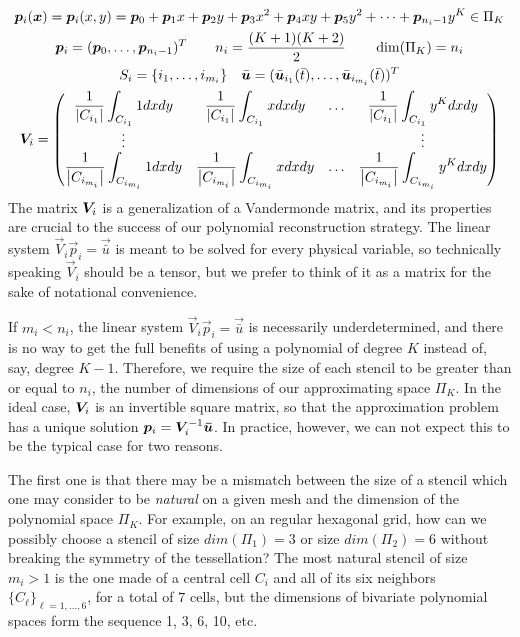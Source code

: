 \begin{gather*}
\bm{p}_i(\bm{x})
=\bm{p}_i(x,y)
=\bm{p}_{0}+\bm{p}_{1}x+\bm{p}_{2}y+\bm{p}_{3}x^{2}+\bm{p}_{4}xy+\bm{p}_{5}y^{2}+
\dots+\bm{p}_{n_{i}-1}y^{K} \in \Pi_K \\
\bm{p}_i = (\bm{p}_0, \dots, \bm{p}_{n_i-1})^T \qquad
n_{i}=\frac{(K+1)(K+2)}{2} \qquad \dim(\Pi_K) = n_i \\
S_{i}=\{i_{1},\dots,i_{m_{i}}\} \quad
\bar{\bm{u}} = (\bar{\bm{u}}_{i_1}(\bar{t}),
	\dots, \bar{\bm{u}}_{i_{m_i}}(\bar{t}))^T \\
\bm{V}_{i}=\begin{pmatrix}
\dfrac{1}{\left| C_{i_{1}} \right|}\displaystyle\int_{C_{i_{1}}} 1 dxdy &\dfrac{1}{\left| C_{i_{1}} \right|} \displaystyle\int_{C_{i_{1}}} x dxdy &\dots&\dfrac{1}{\left| C_{i_{1}} \right|}\displaystyle\int_{C_{i_{1}}} y^{K} dxdy\\
\vdots&&&\vdots\\
\dfrac{1}{\left| C_{i_{m_{i}}} \right|}\displaystyle\int_{C_{i_{m_{i}}}} 1 dxdy &\dfrac{1}{\left| C_{i_{m_{i}}} \right|} \displaystyle\int_{C_{i_{m_{i}}}} x dxdy &\dots&\dfrac{1}{\left| C_{i_{m_{i}}} \right|}\displaystyle\int_{C_{i_{m_{i}}}} y^{K} dxdy\\
\end{pmatrix}
\end{gather*}
The matrix $\bm{V}_{i}$ is a generalization of a Vandermonde matrix, and its
properties are crucial to the success of our polynomial reconstruction strategy.
The linear system $\vec{V}_{i}\vec{p}_{i}=\vec{\bar{u}}$ is meant to be solved
for every physical variable, so technically speaking $\vec{V}_{i}$ should
be a tensor, but we prefer to think of it as a matrix for the sake of
notational convenience.

If $m_{i}<n_{i}$, the linear system $\vec{V}_{i}\vec{p}_{i}=\vec{\bar{u}}$
is necessarily underdetermined, and there is no way to get the full benefits
of using a polynomial of degree $K$ instead of, say, degree $K-1$. Therefore,
we require the size of each stencil to be greater than or equal to $n_{i}$,
the number of dimensions of our approximating space $\Pi_K$. In the ideal
case, $\bm{V}_{i}$ is an invertible square matrix, so that the approximation
problem has a unique solution $\bm{p}_{i}=\bm{V}^{-1}_{i}\bm{\bar{u}}$.
In practice, however, we can not expect this to be the typical case for two reasons.

The first one is that there may be a mismatch between the size of a stencil
which one may consider to be \emph{natural} on a given mesh and the dimension of
the polynomial space $\Pi_{K}$. For example, on an regular hexagonal grid,
how can we possibly choose a stencil of size $dim(\Pi_{1})=3$ or size
$dim(\Pi_{2})=6$ without breaking the symmetry of the tessellation?
The most natural stencil of size $m_{i}>1$ is the one made of a central
cell $C_{i}$ and all of its six neighbors $\{C_{\ell}\}_{\ell=1,\dots,6}$,
for a total of $7$ cells, but the dimensions of bivariate polynomial spaces
form the sequence 1, 3, 6, 10, etc.

